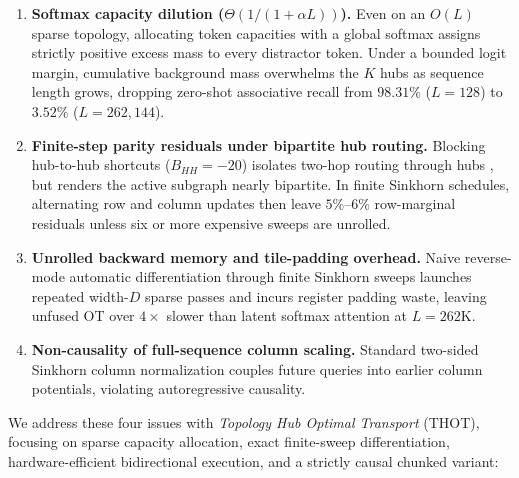 \documentclass[11pt]{article}
\begin{document}
\begin{enumerate}[leftmargin=1.5em]
  \item \textbf{Softmax capacity dilution ($\Theta(1/(1+\alpha L))$).} Even on an $O(L)$ sparse topology, allocating token capacities with a global softmax assigns strictly positive excess mass to every distractor token. Under a bounded logit margin, cumulative background mass overwhelms the $K$ hubs as sequence length grows, dropping zero-shot associative recall from $98.31\%$ ($L=128$) to $3.52\%$ ($L=262{,}144$).
  \item \textbf{Finite-step parity residuals under bipartite hub routing.} Blocking hub-to-hub shortcuts ($B_{HH} = -20$) isolates two-hop routing through hubs \citep{forde2026blockwise,forde2026topology}, but renders the active subgraph nearly bipartite. In finite Sinkhorn schedules, alternating row and column updates then leave $5\%$--$6\%$ row-marginal residuals unless six or more expensive sweeps are unrolled.
  \item \textbf{Unrolled backward memory and tile-padding overhead.} Naive reverse-mode automatic differentiation through finite Sinkhorn sweeps launches repeated width-$D$ sparse passes and incurs register padding waste, leaving unfused OT over $4\times$ slower than latent softmax attention at $L=262\text{K}$.
  \item \textbf{Non-causality of full-sequence column scaling.} Standard two-sided Sinkhorn column normalization couples future queries into earlier column potentials, violating autoregressive causality.
\end{enumerate}

We address these four issues with \emph{Topology Hub Optimal Transport} (THOT), focusing on sparse capacity allocation, exact finite-sweep differentiation, hardware-efficient bidirectional execution, and a strictly causal chunked variant:
\end{document}
